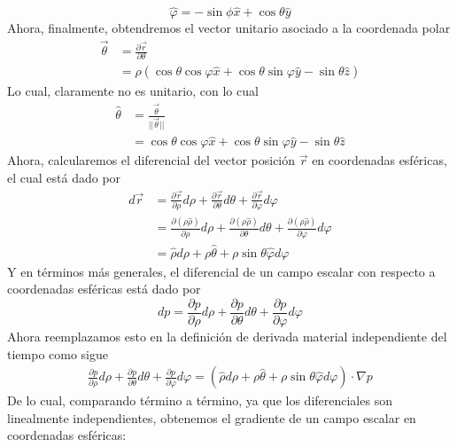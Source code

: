 \documentclass[11pt,letterpaper]{article}
\begin{document}
\begin{equation}
    \hat{\varphi}= - \sin{\phi}\hat{x}+\cos{\theta}\hat{y}
\end{equation}
Ahora, finalmente, obtendremos el vector unitario asociado a la coordenada polar
\begin{align*}
    \vec{\theta} & =\frac{\partial \vec{r}}{\partial \theta} \\
    & = \rho(\cos{\theta}\cos{\varphi}\hat{x}+\cos{\theta}\sin{\varphi}\hat{y}-\sin{\theta}\hat{z})
\end{align*}
Lo cual, claramente no es unitario, con lo cual
\begin{align*}
    \hat{\theta} & = \frac{\vec{\theta}}{||\vec{\theta}||} \\
    & = \cos{\theta}\cos{\varphi}\hat{x}+\cos{\theta}\sin{\varphi}\hat{y}-\sin{\theta}\hat{z}
\end{align*}
Ahora, calcularemos el diferencial del vector posición $\vec{r}$ en coordenadas esféricas, el cual está dado por
\begin{align*}
    d\vec{r} & =\frac{\partial \vec{r}}{\partial \rho} d\rho + \frac{\partial \vec{r}}{\partial \theta} d\theta + \frac{\partial \vec{r}}{\partial \varphi}d\varphi \\
    & = \frac{\partial (\rho\hat{\rho})}{\partial \rho} d\rho + \frac{\partial (\rho\hat{\rho})}{\partial \theta} d\theta + \frac{\partial (\rho\hat{\rho})}{\partial \varphi}d\varphi \\
    & = \hat{\rho}d\rho + \rho \hat{\theta} + \rho \sin{\theta} \hat{\varphi}d\varphi 
\end{align*}
Y en términos más generales, el diferencial de un campo escalar con respecto a coordenadas esféricas está dado por
\begin{equation}
    dp=\frac{\partial p}{\partial \rho} d\rho + \frac{\partial p}{\partial \theta} d\theta + \frac{\partial p}{\partial \varphi}d\varphi
\end{equation}
Ahora reemplazamos esto en la definición de derivada material independiente del tiempo como sigue
\begin{align*}
    \frac{\partial p}{\partial \rho} d\rho + \frac{\partial p}{\partial \theta} d\theta + \frac{\partial p}{\partial \varphi}d\varphi = (\hat{\rho}d\rho + \rho \hat{\theta} + \rho \sin{\theta} \hat{\varphi}d\varphi ) \cdot \nabla p 
\end{align*}
De lo cual, comparando término a término, ya que los diferenciales son linealmente independientes, obtenemos el gradiente de un campo escalar en coordenadas esféricas:
\end{document}
